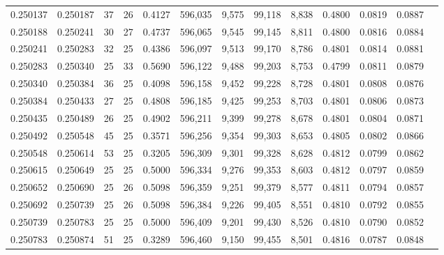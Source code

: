 \begin{tabular}{rrrrrrrrrrrrr}
0.250137 & 0.250187 &    37 &  26 &                                     0.4127 & 596,035 &   9,575 &  99,118 &   8,838 & 0.4800 & 0.0819 & 0.0887 \\
0.250188 & 0.250241 &    30 &  27 &                                     0.4737 & 596,065 &   9,545 &  99,145 &   8,811 & 0.4800 & 0.0816 & 0.0884 \\
0.250241 & 0.250283 &    32 &  25 &                                     0.4386 & 596,097 &   9,513 &  99,170 &   8,786 & 0.4801 & 0.0814 & 0.0881 \\
0.250283 & 0.250340 &    25 &  33 &                                     0.5690 & 596,122 &   9,488 &  99,203 &   8,753 & 0.4799 & 0.0811 & 0.0879 \\
0.250340 & 0.250384 &    36 &  25 &                                     0.4098 & 596,158 &   9,452 &  99,228 &   8,728 & 0.4801 & 0.0808 & 0.0876 \\
0.250384 & 0.250433 &    27 &  25 &                                     0.4808 & 596,185 &   9,425 &  99,253 &   8,703 & 0.4801 & 0.0806 & 0.0873 \\
0.250435 & 0.250489 &    26 &  25 &                                     0.4902 & 596,211 &   9,399 &  99,278 &   8,678 & 0.4801 & 0.0804 & 0.0871 \\
0.250492 & 0.250548 &    45 &  25 &                                     0.3571 & 596,256 &   9,354 &  99,303 &   8,653 & 0.4805 & 0.0802 & 0.0866 \\
0.250548 & 0.250614 &    53 &  25 &                                     0.3205 & 596,309 &   9,301 &  99,328 &   8,628 & 0.4812 & 0.0799 & 0.0862 \\
0.250615 & 0.250649 &    25 &  25 &                                     0.5000 & 596,334 &   9,276 &  99,353 &   8,603 & 0.4812 & 0.0797 & 0.0859 \\
0.250652 & 0.250690 &    25 &  26 &                                     0.5098 & 596,359 &   9,251 &  99,379 &   8,577 & 0.4811 & 0.0794 & 0.0857 \\
0.250692 & 0.250739 &    25 &  26 &                                     0.5098 & 596,384 &   9,226 &  99,405 &   8,551 & 0.4810 & 0.0792 & 0.0855 \\
0.250739 & 0.250783 &    25 &  25 &                                     0.5000 & 596,409 &   9,201 &  99,430 &   8,526 & 0.4810 & 0.0790 & 0.0852 \\
0.250783 & 0.250874 &    51 &  25 &                                     0.3289 & 596,460 &   9,150 &  99,455 &   8,501 & 0.4816 & 0.0787 & 0.0848 \\

\end{tabular}
